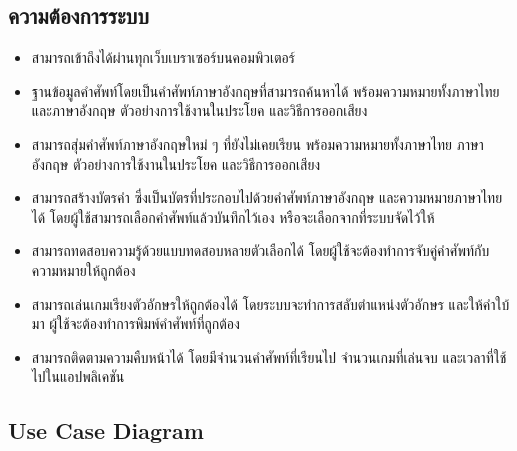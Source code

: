 \documentclass[12pt,oneside,openright,a4paper]{cpe-thai-project}
\begin{document}
\subsection{ความต้องการระบบ}
\begin{itemize}
	\item สามารถเข้าถึงได้ผ่านทุกเว็บเบราเซอร์บนคอมพิวเตอร์
	\item ฐานข้อมูลคำศัพท์โดยเป็นคำศัพท์ภาษาอังกฤษที่สามารถค้นหาได้ พร้อมความหมายทั้งภาษาไทยและภาษาอังกฤษ ตัวอย่างการใช้งานในประโยค และวิธีการออกเสียง
	\item สามารถสุ่มคำศัพท์ภาษาอังกฤษใหม่ ๆ ที่ยังไม่เคยเรียน พร้อมความหมายทั้งภาษาไทย ภาษาอังกฤษ ตัวอย่างการใช้งานในประโยค และวิธีการออกเสียง
	\item สามารถสร้างบัตรคำ ซึ่งเป็นบัตรที่ประกอบไปด้วยคำศัพท์ภาษาอังกฤษ และความหมายภาษาไทยได้ โดยผู้ใช้สามารถเลือกคำศัพท์แล้วบันทึกไว้เอง หรือจะเลือกจากที่ระบบจัดไว้ให้
	\item สามารถทดสอบความรู้ด้วยแบบทดสอบหลายตัวเลือกได้ โดยผู้ใช้จะต้องทำการจับคู่คำศัพท์กับความหมายให้ถูกต้อง
	\item สามารถเล่นเกมเรียงตัวอักษรให้ถูกต้องได้ โดยระบบจะทำการสลับตำแหน่งตัวอักษร และให้คำใบ้มา ผู้ใช้จะต้องทำการพิมพ์คำศัพท์ที่ถูกต้อง
	\item สามารถติดตามความคืบหน้าได้ โดยมีจำนวนคำศัพท์ที่เรียนไป จำนวนเกมที่เล่นจบ และเวลาที่ใช้ไปในแอปพลิเคชัน
\end{itemize}

\pagebreak
\subsection{Use Case Diagram}
\end{document}
